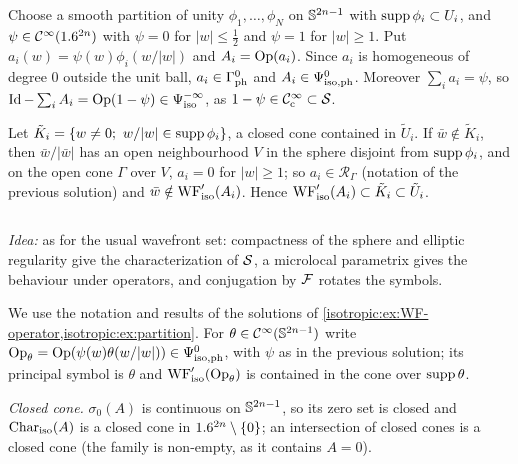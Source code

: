 \subsection*{}

Choose a smooth partition of unity $\phi_1,\dots,\phi_N$ on $\mathbb{S}^{2n-1}$ with
$\operatorname{supp}\phi_i\subset U_i$, and $\psi\in\mathcal{C}^\infty(1.6^{2n})$ with $\psi=0$ for $|w|\le\frac12$
and $\psi=1$ for $|w|\ge1$. Put $a_i(w)=\psi(w)\phi_i(w/|w|)$ and $A_i=\operatorname{Op}(a_i)$.
Since $a_i$ is homogeneous of degree $0$ outside the unit ball, $a_i\in\Gamma^{0}_{\mathrm{ph}}$
and $A_i\in\Psi^{0}_{\mathrm{iso,ph}}$. Moreover $\sum_ia_i=\psi$, so
$\operatorname{Id}-\sum_iA_i=\operatorname{Op}(1-\psi)\in\Psi^{-\infty}_{\mathrm{iso}}$, as $1-\psi\in\mathcal{C}^\infty_{\mathrm{c}}\subset\mathcal{S}$.

Let $\tilde K_i=\{w\ne0;\ w/|w|\in\supp\phi_i\}$, a closed cone contained in
$\tilde U_i$. If $\bar w\notin\tilde K_i$, then $\bar w/|\bar w|$ has an open
neighbourhood $V$ in the sphere disjoint from $\operatorname{supp}\phi_i$, and on the open
cone $\Gamma$ over $V$, $a_i=0$ for $|w|\ge1$; so $a_i\in\mathcal R_\Gamma$ (notation of
the previous solution) and $\bar w\notin\operatorname{WF}'_{\mathrm{iso}}(A_i)$. Hence
$\operatorname{WF}'_{\mathrm{iso}}(A_i)\subset\tilde K_i\subset\tilde U_i$.

\subsection*{}

\emph{Idea:} as for the usual wavefront set: compactness of the sphere and
elliptic regularity give the characterization of $\mathcal{S}$, a microlocal
parametrix gives the behaviour under operators, and conjugation by $\mathcal{F}$
rotates the symbols.

We use the notation and results of the solutions of
\cref{isotropic:ex:WF-operator,isotropic:ex:partition}. For
$\theta\in\mathcal{C}^\infty(\mathbb{S}^{2n-1})$ write $\operatorname{Op}_\theta=\operatorname{Op}(\psi(w)\theta(w/|w|))\in\Psi^{0}_{\mathrm{iso,ph}}$,
with $\psi$ as in the previous solution; its principal symbol is $\theta$ and
$\operatorname{WF}'_{\mathrm{iso}}(\operatorname{Op}_\theta)$ is contained in the cone over $\operatorname{supp}\theta$.

\emph{Closed cone.} $\sigma_0(A)$ is continuous on $\mathbb{S}^{2n-1}$, so its zero
set is closed and $\operatorname{Char}_{\mathrm{iso}}(A)$ is a closed cone in
$1.6^{2n}\setminus\{0\}$; an intersection of closed cones is a closed cone (the
family is non-empty, as it contains $A=0$).

